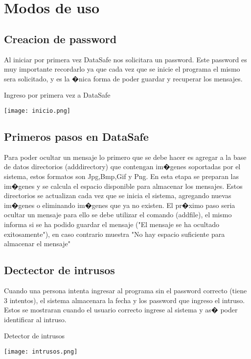 \documentclass[12pt]{article}
\numberwithin{equation}{section}
\numberwithin{figure}{section}
\numberwithin{table}{section}
\begin{document}
\section{Modos de uso}

\subsection{Creacion de password}
Al iniciar por primera vez DataSafe nos solicitara un password. Este password es muy importante recordarlo ya que cada vez que se inicie el programa el mismo sera solicitado,
y es la �nica forma de poder guardar y recuperar los mensajes.

\smallskip
\smallskip
\begin{center}
Ingreso por primera vez a DataSafe
\end{center}
\smallskip
\begin{center}
 \texttt{[image: inicio.png]}
\end{center}

\subsection{Primeros pasos en DataSafe}
Para poder ocultar un mensaje lo primero que se debe hacer es agregar a la base de datos directorios (adddirectory) que contengan im�genes soportadas por el sistema,
estos formatos son Jpg,Bmp,Gif y Png.
En esta etapa se preparan las im�genes y se calcula el espacio disponible para almacenar los mensajes.
Estos directorios se actualizan cada vez que se inicia el sistema, agregando nuevas im�genes o eliminando im�genes que ya no existen.
El pr�ximo paso seria ocultar un mensaje para ello se debe utilizar el comando (addfile), el mismo informa si se ha podido guardar
el mensaje ("El mensaje se ha ocultado exitosamente"), en caso contrario muestra "No hay espacio suficiente para almacenar el mensaje"

\subsection{Dectector de intrusos}
Cuando una persona intenta ingresar al programa sin el password correcto (tiene 3 intentos), el sistema almacenara la fecha y los password que ingreso el intruso. Estos se mostraran cuando el usuario correcto ingrese al sistema y as� poder identificar al intruso.
\smallskip
\smallskip
\begin{center}
 Detector de intrusos
\end{center}
\smallskip
\begin{center}
 \texttt{[image: intrusos.png]}
\end{center}
\end{document}
